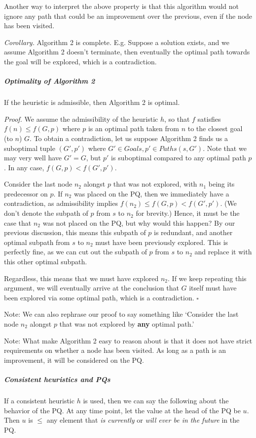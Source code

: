 \documentclass[a4paper]{article}
\begin{document}
Another way to interpret the above property is that this algorithm would not ignore any path that could be an improvement over the previous, even if the node has been visited.

\textit{Corollary.} Algorithm 2 is complete. E.g. Suppose a solution exists, and we assume Algorithm 2 doesn't terminate, then eventually the optimal path towards the goal will be explored, which is a contradiction.

\subparagraph{Optimality of Algorithm 2} If the heuristic is admissible, then Algorithm 2 is optimal.

\textit{Proof.} We assume the admissibility of the heuristic $h$, so that $f$ satisfies $f(n)\leq f(G, p)$ where $p$ is an optimal path taken from $n$ to the closest goal (to $n$) $G$. To obtain a contradiction, let us suppose Algorithm 2 finds us a suboptimal tuple $(G', p')$ where $G'\in Goals, p'\in Paths(s, G')$. Note that we may very well have $G' = G$, but $p'$ is suboptimal compared to any optimal path $p$. In any case, $f(G, p) < f(G', p')$.

Consider the last node $n_2$ alongst $p$ that was not explored, with $n_1$ being its predecessor on $p$. If $n_2$ was placed on the PQ, then we immediately have a contradiction, as admissibility implies $f(n_2) \leq f(G, p) < f(G', p')$. (We don't denote the subpath of $p$ from $s$ to $n_2$ for brevity.) Hence, it must be the case that $n_2$ was not placed on the PQ, but why would this happen? By our previous discussion, this means this subpath of $p$ is redundant, and another optimal subpath from $s$ to $n_2$ must have been previously explored. This is perfectly fine, as we can cut out the subpath of $p$ from $s$ to $n_2$ and replace it with this other optimal subpath.

Regardless, this means that we must have explored $n_2$. If we keep repeating this argument, we will eventually arrive at the conclusion that $G$ itself must have been explored via some optimal path, which is a contradiction. $\square$ 

Note: We can also rephrase our proof to say something like `Consider the last node $n_2$ alongst $p$ that was not explored by \textbf{any} optimal path.'

Note: What make Algorithm 2 easy to reason about is that it does not have strict requirements on whether a node has been visited. As long as a path is an improvement, it will be considered on the PQ.

\subparagraph{Consistent heuristics and PQs} If a consistent heuristic $h$ is used, then we can say the following about the behavior of the PQ. At any time point, let the value at the head of the PQ be $u$. Then $u$ is $\leq$ any element that \textit{is currently} or \textit{will ever be in the future} in the PQ.
\end{document}
